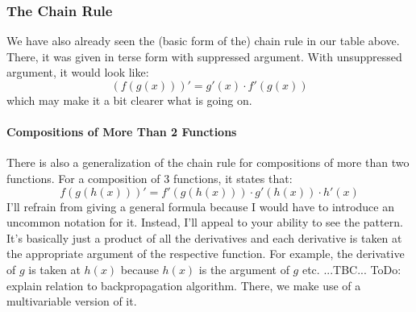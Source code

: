 \subsubsection{The Chain Rule}
We have also already seen the (basic form of the) chain rule in our table above. There, it was given in terse form with suppressed argument. With unsuppressed argument, it would look like:
\begin{equation}
 (f( g(x)))' = g'(x) \cdot f'(g(x))
\end{equation}
which may make it a bit clearer what is going on.

\paragraph{Compositions of More Than 2 Functions}
There is also a generalization of the chain rule for compositions of more than two functions. For a composition of 3 functions, it states that:
\begin{equation}
f(g(h(x)))' =  f'(g(h(x))) \cdot g'(h(x)) \cdot h'(x)
\end{equation}
I'll refrain from giving a general formula because I would have to introduce an uncommon notation for it. Instead, I'll appeal to your ability to see the pattern. It's basically just a product of all the derivatives and each derivative is taken at the appropriate argument of the respective function. For example, the derivative of $g$ is taken at $h(x)$ because $h(x)$ is the argument of $g$ etc. ...TBC... ToDo: explain relation to backpropagation algorithm. There, we make use of a multivariable version of it.





